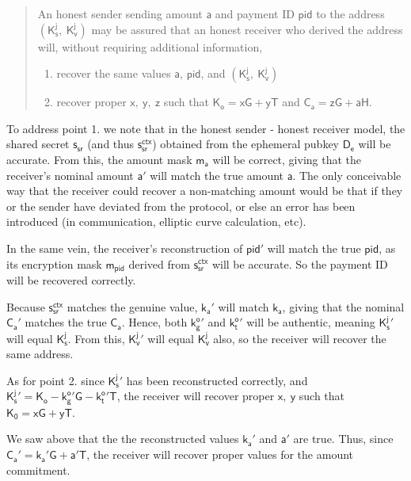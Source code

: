 \documentclass{article}
\theoremstyle{definition}
\newcommand{\6}{\mathbf}
\newcommand{\7}{\mathcal}
\renewcommand{\sf}[1]{{\mathsf{#1}}}
\begin{document}
\begin{quote}
        An honest sender sending amount $\sf{a}$ and payment ID $\sf{pid}$ to the address $(\sf{K_{s}^j}, \ \sf{K_{v}^j})$ may be assured that an honest receiver who derived the address will, without requiring additional information, 
    \begin{enumerate}
        \item recover the same values $\sf{a}$, $\sf{pid}$, and $(\sf{K_{s}^j}, \ \sf{K_{v}^j})$
    
        \item recover proper $\sf{x, \ y, \ z}$ such that $\sf{K_o = xG + yT}$ and $\sf{C_a} = \sf{zG} + \sf{aH}$.
    \end{enumerate}
\end{quote}


To address point 1. we note that in the honest sender - honest receiver model, the shared secret $\sf{s_{sr}}$ (and thus $\sf{s_{sr}^{ctx}}$) obtained from the ephemeral pubkey $\sf{D_e}$ will be accurate. From this, the amount mask $\sf{m_a}$ will be correct, giving that the receiver's nominal amount $\sf{a}'$ will match the true amount $\sf{a}$. The only conceivable way that the receiver could recover a non-matching amount would be that if they or the sender have deviated from the protocol, or else an error has been introduced (in communication, elliptic curve calculation, etc).
\medskip 

In the same vein, the receiver's reconstruction of $\sf{pid}'$ will match the true $\sf{pid}$, as its encryption mask $\sf{m_{pid}}$ derived from $\sf{s_{sr}^{ctx}}$ will be accurate. So the payment ID will be recovered correctly.
\medskip 

Because $\sf{s_{sr}^{ctx}}$ matches the genuine value, $\sf{k_{a}}'$ will match $\sf{k_a}$, giving that the nominal $\sf{C_{a}}'$ matches the true $\sf{C_a}$. Hence, both $\sf{k_g^{o}}'$ and $\sf{k_t^{o}}'$ will be authentic, meaning $\sf{K_{s}^{j}}'$ will equal $\sf{K_{s}^j}$. From this, $\sf{K_{v}^{j}}'$ will equal $\sf{K_{v}^j}$ also, so the receiver will recover the same address.
\medskip 

As for point 2. since $\sf{K_{s}^{j}}'$ has been reconstructed correctly, and $\sf{K_{s}^{j}}' = \sf{K_o} - \sf{k_g^{o}}' \sf{G} - \sf{k_t^{o}}' \sf{T}$, the receiver will recover proper $\sf{x, \ y}$ such that $\sf{K_0 = xG + yT}$.
\medskip 

We saw above that the the reconstructed values $\sf{k_a}'$ and $\sf{a}'$ are true. Thus, since $\sf{C_{a}}' = \sf{k_a}' \sf{G} + \sf{a}' \sf{T}$, the receiver will recover proper values for the amount commitment. 
\end{document}
